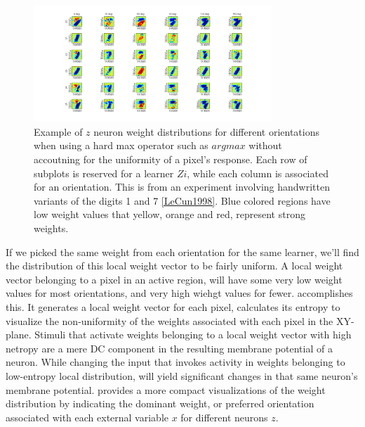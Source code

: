 \documentclass{report}
\begin{document}
\begin{figure}[ht]
\centering
\includegraphics[width=0.8\textwidth]{weightsPerOrientation}
\caption{Example of $z$ neuron weight distributions for different orientations when using a hard max operator such as $argmax$ without accoutning for the uniformity of a pixel's response. Each row of subplots is reserved for a learner $Zi$, while each column is associated for an orientation. This is from an experiment involving handwritten variants of the digits 1 and 7 \cref{LeCun1998}. Blue colored regions have low weight values that yellow, orange and red, represent strong weights.
\label{fig:weightsPerOrientation}}
\end{figure}

If we picked the same weight from each orientation for the same learner, we'll find the distribution of this local weight vector to be fairly uniform. A local weight vector belonging to a pixel in an active region, will have some very low weight values for most orientations, and very high wiehgt values for fewer.  accomplishes this. It generates a local weight vector for each pixel, calculates its entropy to visualize the non-uniformity of the weights associated with each pixel in the XY-plane. Stimuli that activate weights belonging to a local weight vector with high netropy are a mere DC component in the resulting membrane potential of a neuron. While changing the input that invokes activity in weights belonging to low-entropy local distribution, will yield significant changes in that same neuron's membrane potential.  provides a more compact visualizations of the weight distribution by indicating the dominant weight, or preferred orientation associated with each external variable $x$ for different neurons $z$.
\end{document}

